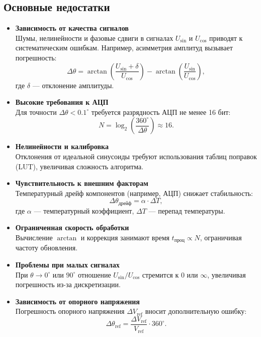\subsection{Основные недостатки}
\begin{itemize}
    \item \textbf{Зависимость от качества сигналов} \\
    Шумы, нелинейности и фазовые сдвиги в сигналах \( U_{\sin} \) и \( U_{\cos} \) приводят к систематическим ошибкам. Например, асимметрия амплитуд вызывает погрешность:
    \[
    \Delta\theta = \arctan\left(\frac{U_{\sin} + \delta}{U_{\cos}}\right) - \arctan\left(\frac{U_{\sin}}{U_{\cos}}\right),
    \]
    где \(\delta\) — отклонение амплитуды.

    \item \textbf{Высокие требования к АЦП} \\
    Для точности \(\Delta\theta < 0.1^\circ\) требуется разрядность АЦП не менее 16 бит:
    \[
    N = \log_2\left(\frac{360^\circ}{\Delta\theta}\right) \approx 16.
    \]

    \item \textbf{Нелинейности и калибровка} \\
    Отклонения от идеальной синусоиды требуют использования таблиц поправок (LUT), увеличивая сложность алгоритма.

    \item \textbf{Чувствительность к внешним факторам} \\
    Температурный дрейф компонентов (например, АЦП) снижает стабильность:
    \[
    \Delta\theta_{\text{дрейф}} = \alpha \cdot \Delta T,
    \]
    где \(\alpha\) — температурный коэффициент, \(\Delta T\) — перепад температуры.

    \item \textbf{Ограниченная скорость обработки} \\
    Вычисление \(\arctan\) и коррекция занимают время \( t_{\text{проц}} \propto N \), ограничивая частоту обновления.

    \item \textbf{Проблемы при малых сигналах} \\
    При \(\theta \to 0^\circ\) или \(90^\circ\) отношение \( U_{\sin}/U_{\cos} \) стремится к \(0\) или \(\infty\), увеличивая погрешность из-за дискретизации.

    \item \textbf{Зависимость от опорного напряжения} \\
    Погрешность опорного напряжения \(\Delta V_{\text{ref}}\) вносит дополнительную ошибку:
    \[
    \Delta\theta_{\text{ref}} = \frac{\Delta V_{\text{ref}}}{V_{\text{ref}}} \cdot 360^\circ.
    \]
\end{itemize}

